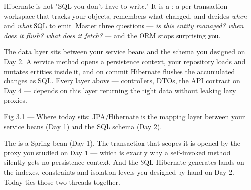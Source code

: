 \begin{keyidea}
Hibernate is not "SQL you don't have to write." It is a : a per-transaction workspace that tracks your objects, remembers what changed, and decides \emph{when} and \emph{what} SQL to emit. Master three questions --- \emph{is this entity managed? when does it flush? what does it fetch?} --- and the ORM stops surprising you.
\end{keyidea}

 The data layer sits between your service beans and the schema you designed on Day 2. A  service method opens a persistence context, your repository loads and mutates entities inside it, and on commit Hibernate flushes the accumulated changes as SQL. Every layer above --- controllers, DTOs, the API contract on Day 4 --- depends on this layer returning the right data without leaking lazy proxies.

\begin{wbfigure}{Fig 3.1 — Where today sits: JPA/Hibernate is the mapping layer between your service beans (Day 1) and the SQL schema (Day 2).}
\end{wbfigure}

 The  is a Spring bean (Day 1). The transaction that scopes it is opened by the  proxy you studied on Day 1 --- which is exactly why a self-invoked  method silently gets no persistence context. And the SQL Hibernate generates lands on the indexes, constraints and isolation levels you designed by hand on Day 2. Today ties those two threads together.

